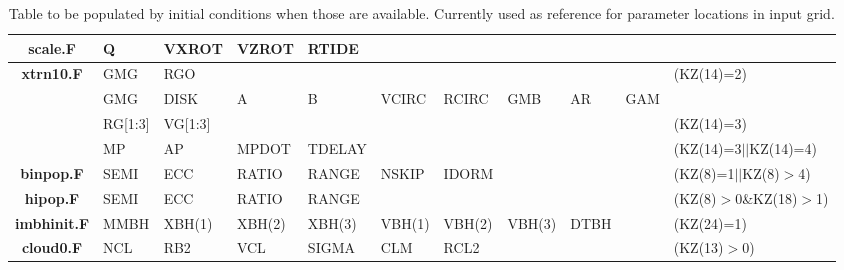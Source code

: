 \documentclass[twocolumn]{aastex62}
\begin{document}
\begin{table}[ht]
\begin{tabular}{c | l l l l l l l l l l}
        \hline
        \textbf{scale.F} & Q & VXROT & VZROT & RTIDE \\
        \hline
        \textbf{xtrn10.F} & GMG & RGO & & & & & & & &   (KZ(14)=2) \\
        & GMG & DISK & A & B & VCIRC & RCIRC & GMB & AR & GAM \\
        & RG[1:3] & VG[1:3] & & & & & & & &   (KZ(14)=3) \\
        & MP & AP & MPDOT & TDELAY & & & & & &  (KZ(14)=3$||$KZ(14)=4) \\
        \hline
        \textbf{binpop.F} & SEMI & ECC & RATIO & RANGE & NSKIP & IDORM & & & & (KZ(8)=1$||$KZ(8)$>$4) \\
        \hline
        \textbf{hipop.F} & SEMI & ECC & RATIO & RANGE & & & & & & (KZ(8)$>$0\&KZ(18)$>$1) \\
        \hline
        \textbf{imbhinit.F} & MMBH & XBH(1) & XBH(2) & XBH(3) & VBH(1) & VBH(2) & VBH(3) & DTBH & & (KZ(24)=1) \\
        \hline
        \textbf{cloud0.F} & NCL & RB2 & VCL & SIGMA & CLM & RCL2 & & & & (KZ(13)$>$0) \\
        \hline
    \end{tabular}
    \caption{Table to be populated by initial conditions when those are available. Currently used as reference for parameter locations in input grid.}
    \label{tab:inputref}
\end{table}




\end{document}
